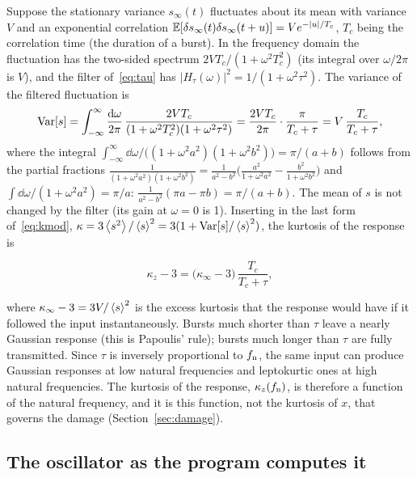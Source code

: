 Suppose the stationary variance $s_\infty(t)$ fluctuates about its mean with variance $V$ and an
exponential correlation $\mathbb{E}[\delta s_\infty(t)\delta s_\infty(t+u)] = Ve^{-|u|/T_c}$, $T_c$ being the
correlation time (the duration of a burst). In the frequency domain the fluctuation has the two-sided
spectrum $2VT_c/(1+\omega^2T_c^2)$ (its integral over $\omega/2\pi$ is $V$), and the filter
of~\eqref{eq:tau} has $|H_\tau(\omega)|^2 = 1/(1+\omega^2\tau^2)$. The variance of the filtered
fluctuation is
\begin{equation}
  \operatorname{Var}[s] = \int_{-\infty}^{\infty}\frac{\mathrm{d}\omega}{2\pi}\,
  \frac{2VT_c}{(1+\omega^2T_c^2)(1+\omega^2\tau^2)} = \frac{2VT_c}{2\pi}\cdot\frac{\pi}{T_c+\tau}
  = V\,\frac{T_c}{T_c+\tau},
\end{equation}
where the integral $\int_{-\infty}^{\infty}\dd\omega/\bigl((1+\omega^2a^2)(1+\omega^2b^2)\bigr) =
\pi/(a+b)$ follows from the partial fractions $\frac{1}{(1+\omega^2a^2)(1+\omega^2b^2)} =
\frac{1}{a^2-b^2}\bigl(\frac{a^2}{1+\omega^2a^2}-\frac{b^2}{1+\omega^2b^2}\bigr)$ and
$\int\dd\omega/(1+\omega^2a^2) = \pi/a$: $\frac{1}{a^2-b^2}(\pi a - \pi b) = \pi/(a+b)$.
The mean of $s$ is not changed by the filter (its gain at $\omega=0$ is 1). Inserting in the last
form of~\eqref{eq:kmod}, $\kappa = 3\left\langle s^2 \right\rangle/\left\langle s \right\rangle^2 = 3(1+\operatorname{Var}[s]/\left\langle s \right\rangle^2)$, the kurtosis of
the response is
\begin{result}
\begin{equation}\label{eq:papoulis}
  \kappa_z - 3 = \bigl(\kappa_\infty - 3\bigr)\,\frac{T_c}{T_c+\tau},
\end{equation}
\end{result}
where $\kappa_\infty-3 = 3V/\left\langle s \right\rangle^2$ is the excess kurtosis that the response would have if it
followed the input instantaneously. Bursts much shorter than $\tau$ leave a nearly Gaussian response
(this is Papoulis' rule); bursts much longer than $\tau$ are fully transmitted. Since $\tau$ is
inversely proportional to $f_{\mathrm{n}}$, the same input can produce Gaussian responses at low natural
frequencies and leptokurtic ones at high natural frequencies. The kurtosis of the response,
$\kappa_z(f_{\mathrm{n}})$, is therefore a function of the natural frequency, and it is this function, not the
kurtosis of $x$, that governs the damage (Section~\ref{sec:damage}).

\subsection{The oscillator as the program computes it}\label{sec:digital}

